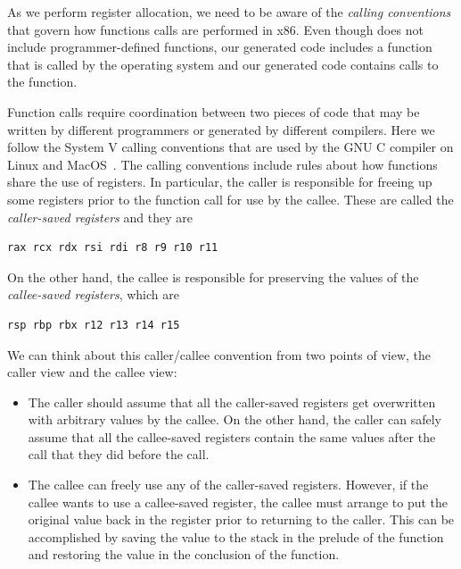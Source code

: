 \documentclass[7x10,nocrop]{TimesAPriori_MIT}%
\begin{document}
As we perform register allocation, we need to be aware of the
\emph{calling conventions}  that govern how
functions calls are performed in x86.
%
Even though \LangVar{} does not include programmer-defined functions,
our generated code includes a  function that is called by
the operating system and our generated code contains calls to the
 function.

Function calls require coordination between two pieces of code that
may be written by different programmers or generated by different
compilers. Here we follow the System V calling conventions that are
used by the GNU C compiler on Linux and
MacOS~\citep{Bryant:2005aa,Matz:2013aa}.
%
The calling conventions include rules about how functions share the
use of registers. In particular, the caller is responsible for freeing
up some registers prior to the function call for use by the callee.
These are called the \emph{caller-saved registers}
and they are
\begin{lstlisting}
rax rcx rdx rsi rdi r8 r9 r10 r11
\end{lstlisting}
On the other hand, the callee is responsible for preserving the values
of the \emph{callee-saved registers}, 
which are
\begin{lstlisting}
rsp rbp rbx r12 r13 r14 r15
\end{lstlisting}

We can think about this caller/callee convention from two points of
view, the caller view and the callee view:
\begin{itemize}
\item The caller should assume that all the caller-saved registers get
  overwritten with arbitrary values by the callee.  On the other hand,
  the caller can safely assume that all the callee-saved registers
  contain the same values after the call that they did before the
  call.
\item The callee can freely use any of the caller-saved registers.
  However, if the callee wants to use a callee-saved register, the
  callee must arrange to put the original value back in the register
  prior to returning to the caller. This can be accomplished by saving
  the value to the stack in the prelude of the function and restoring
  the value in the conclusion of the function.
\end{itemize}
\end{document}
